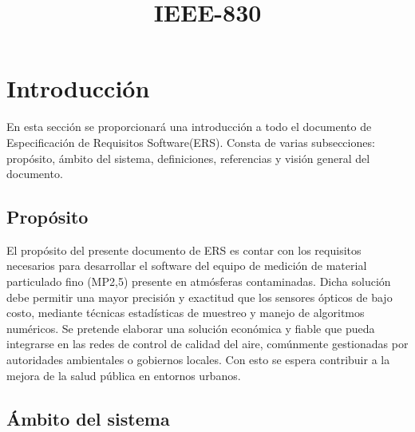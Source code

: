 \documentclass[12pt,a4paper, twosite]{article}
\date{}
\title{IEEE-830}
\begin{document}
\maketitle
\tableofcontents

\newpage

\section{Introducción}
\label{sec:org60390fa}

En esta sección se proporcionará una introducción a todo el
documento de Especificación de Requisitos Software(ERS). Consta de
varias subsecciones: propósito, ámbito del sistema, definiciones,
referencias y visión general del documento.


\subsection{Propósito}
\label{sec:org434c3ef}


El propósito del presente documento de ERS es contar con los requisitos necesarios para desarrollar el software del equipo de medición de material particulado fino (MP2,5) presente en atmósferas contaminadas. Dicha solución debe permitir una mayor precisión y exactitud que los sensores ópticos de bajo costo, mediante técnicas estadísticas de muestreo y manejo de algoritmos numéricos. Se pretende elaborar una solución económica y fiable que pueda integrarse en las redes de control de calidad del aire, comúnmente gestionadas por autoridades ambientales o gobiernos locales. Con esto se espera contribuir a la mejora de la salud pública en entornos urbanos. 


\subsection{Ámbito del sistema}
\label{sec:org12e44a1}
\end{document}
